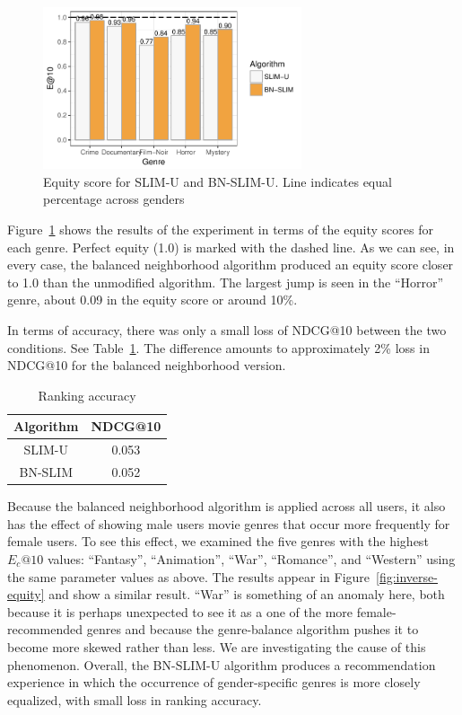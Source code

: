 \begin{figure}[tbh]
    \centering
    \includegraphics[width=3.00in]{imgs/bln/genre-compare3.pdf}
    \caption{Equity score for SLIM-U and BN-SLIM-U. Line indicates equal percentage across genders}
    \label{fig:genre}
\end{figure}

Figure~\ref{fig:genre} shows the results of the experiment in terms of the equity scores for each genre. Perfect equity (1.0) is marked with the dashed line. As we can see, in every case, the balanced neighborhood algorithm produced an equity score closer to 1.0 than the unmodified algorithm. The largest jump is seen in the ``Horror'' genre, about 0.09 in the equity score or around 10\%.

In terms of accuracy, there was only a small loss of NDCG@10 between the two conditions. See Table~\ref{tab:ndcg}. The difference amounts to approximately 2\% loss in NDCG@10 for the balanced neighborhood version.

\begin{table}
\centering
\begin{tabular}{c|c}
    Algorithm &  NDCG@10 \\ \hline
    SLIM-U & 0.053 \\ \hline
    BN-SLIM & 0.052 \\ \hline
\end{tabular}
\caption{Ranking accuracy}
\label{tab:ndcg}
\end{table}

Because the balanced neighborhood algorithm is applied across all users, it also has the effect of showing male users movie genres that occur more frequently for female users. To see this effect, we examined the five genres with the highest $E_c@10$ values: ``Fantasy'', ``Animation'', ``War'', ``Romance'', and ``Western'' using the same parameter values as above. The results appear in Figure~\ref{fig:inverse-equity} and show a similar result. ``War'' is something of an anomaly here, both because it is perhaps unexpected to see it as a one of the more female-recommended genres and because the genre-balance algorithm pushes it to become more skewed rather than less. We are investigating the cause of this phenomenon. Overall, the BN-SLIM-U algorithm produces a recommendation experience in which the occurrence of gender-specific genres is more closely equalized, with small loss in ranking accuracy. 

